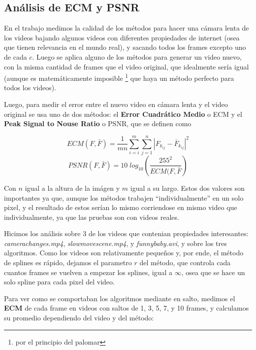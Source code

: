 \subsection {An\'alisis de ECM y PSNR}

En el trabajo medimos la calidad de los m\'etodos para hacer una c\'amara lenta
de los videos bajando algunos videos con diferentes propiedades de internet
(osea que tienen relevancia en el mundo real), y sacando todos los frames
excepto uno de cada $c$. Luego se aplica alguno de los m\'etodos para generar un
video nuevo, con la misma cantidad de frames que el video original, que
idealmente ser\'ia igual (aunque es matem\'aticamente imposible \footnote{por el
principio del palomar} que haya un m\'etodo perfecto para todos los videos).

Luego, para medir el error entre el nuevo video en c\'amara lenta y el video
original se usa uno de dos m\'etodos: el \textbf{Error Cuadr\'atico Medio} o ECM
y el \textbf{Peak Signal to Nouse Ratio} o PSNR, que se definen como

\[
ECM(F, \bar{F}) = \frac{1}{m n} \sum^m_{i = i} \sum^n_{j = 1} \left| F_{k_{i j}} - \bar{F}_{k_{i j}} \right|^2
\]
\[
PSNR(F, \bar{F}) = 10 \; log_{10} \left( \frac{255^2}{ECM(F, \bar{F}} \right)
\]

Con $n$ igual a la altura de la im\'agen y $m$ igual a su largo. Estos dos
valores son importantes ya que, aunque los m\'etodos trabajen
``individualmente'' en un solo pixel, y el resultado de estos ser\'ian lo mismo
corriendose en mismo video que individualmente, ya que las pruebas son con videos
reales.

Hicimos los an\'alisis sobre 3 de los videos que contenian propiedades
interesantes: \textit{camerachanges.mp4}, \textit{slowmovescene.mp4}, y
\textit{funnybaby.avi}, y sobre los tres algoritmos. Como los videos son
relativamente peque\~nos y, por ende, el m\'etodo de splines es r\'apido,
dejamos el parametro $r$ del m\'etodo, que controla cada cuantos frames se
vuelven a empezar los splines, igual a $\infty$, osea que se hace un solo spline
para cada pixel del video.

Para ver como se comportaban los algoritmos mediante en salto, medimos el
\textbf{ECM} de cada frame en videos con saltos de 1, 3, 5, 7, y 10 frames, y
calculamos su promedio dependiendo del video y del m\'etodo:

